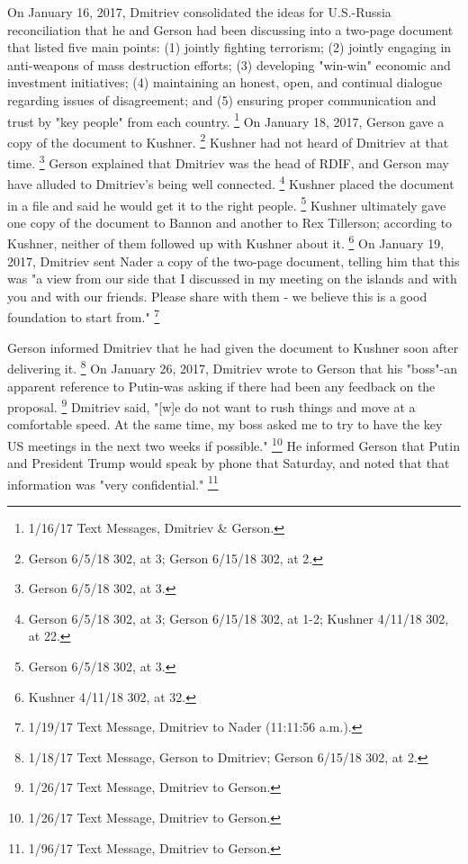 On January 16, 2017, Dmitriev consolidated the ideas for U.S.-Russia reconciliation that he and Gerson had been discussing into a two-page document that listed five main points:
(1) jointly fighting terrorism;
(2) jointly engaging in anti-weapons of mass destruction efforts;
(3) developing "win-win" economic and investment initiatives;
(4) maintaining an honest, open, and continual dialogue regarding issues of disagreement; and
(5) ensuring proper communication and trust by "key people" from each country.%
\footnote{1/16/17 Text Messages, Dmitriev \& Gerson.}
On January 18, 2017, Gerson gave a copy of the document to Kushner.%
\footnote{Gerson 6/5/18 302, at 3;
Gerson 6/15/18 302, at 2.}
Kushner had not heard of Dmitriev at that time.%
\footnote{Gerson 6/5/18 302, at 3.}
Gerson explained that Dmitriev was the head of RDIF, and Gerson may have alluded to Dmitriev's being well connected.%
\footnote{Gerson 6/5/18 302, at 3;
Gerson 6/15/18 302, at 1-2;
Kushner 4/11/18 302, at 22.}
Kushner placed the document in a file and said he would get it to the right people.%
\footnote{Gerson 6/5/18 302, at 3.}
Kushner ultimately gave one copy of the document to Bannon and another to Rex Tillerson; according to Kushner, neither of them followed up with Kushner about it.%
\footnote{Kushner 4/11/18 302, at 32.}
On January 19, 2017, Dmitriev sent Nader a copy of the two-page document, telling him that this was "a view from our side that I discussed in my meeting on the islands and with you and with our friends.
Please share with them - we believe this is a good foundation to start from."%
\footnote{1/19/17 Text Message, Dmitriev to Nader (11:11:56 a.m.).}

Gerson informed Dmitriev that he had given the document to Kushner soon after delivering it.%
\footnote{1/18/17 Text Message, Gerson to Dmitriev;
Gerson 6/15/18 302, at 2.}
On January 26, 2017, Dmitriev wrote to Gerson that his "boss"-an apparent reference to Putin-was asking if there had been any feedback on the proposal.%
\footnote{1/26/17 Text Message, Dmitriev to Gerson.}
Dmitriev said, "[w]e do not want to rush things and move at a comfortable speed.
At the same time, my boss asked me to try to have the key US meetings in the next two weeks if possible."%
\footnote{1/26/17 Text Message, Dmitriev to Gerson.}
He informed Gerson that Putin and President Trump would speak by phone that Saturday, and noted that that information was "very confidential."%
\footnote{1/96/17 Text Message, Dmitriev to Gerson.}

